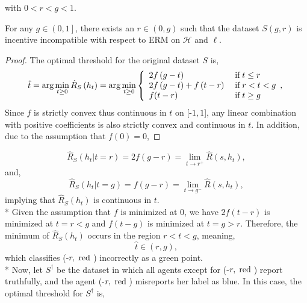 \documentclass{article}
\begin{document}
with $0 < r < g < 1$.
\newline \newline
\begin{prop} \label{prop:ex1} 
For any $g  \in \left(0, 1\right]$, there exists an $r  \in \left(0, g\right)$ such that the dataset $S\left(g, r \right) $ is incentive incompatible with respect to ERM on $\mathcal{H}$ and $\ell$.
\end{prop}
\begin{proof} \label{proof:ex1pf} 
The optimal threshold for the original dataset $S $ is,
\begin{equation} \hat{t} = \arg\displaystyle\min_{t \geq  0} \hat{R}_{S}\left(h_{t}\right) = \arg\displaystyle\min_{t \geq  0}\left\{ \begin{array}{ll}
2 f\left(g - t\right)& \text{\;if\;} t \leq  r \\
2 f\left(g - t\right) + f\left(t - r\right)& \text{\;if\;} r < t < g \\
f(t - r)& \text{\;if\;} t \geq  g \\
\end{array},\right. \end{equation}
Since $f $ is strictly convex thus continuous in $t $ on [-$1, 1$], any linear combination with positive coefficients is also strictly convex and continuous in $t $. In addition, due to the assumption that $f\left(0\right)  = 0$,
\end{proof}
\begin{equation} 
\hat{R}_{S}\left(h_{t} | t = r\right) = 2 f\left(g - r\right) = \lim_{t \to  r^{+}} \hat{R}\left(s, h_{t}\right),
\end{equation}
and,
\begin{equation} 
\hat{R}_{S}\left(h_{t} | t = g\right) = f\left(g - r\right) = \lim_{t \to  g^{-}} \hat{R}\left(s, h_{t}\right),
\end{equation}
implying that $\hat{R}_{S}\left(h_{t}\right)$ is continuous in $t. $
\\* Given the assumption that $f $ is minimized at $0$, we have $2 f\left(t - r\right) $ is minimized at $t  = r < g$ and $f\left(t - g\right) $ is minimized at $t  = g > r$. Therefore, the minimum of $\hat{R}_{S}\left(h_{t}\right)$ occurs in the region $r  < t < g $, meaning,
\begin{equation} 
\hat{t} \in \left(r , g \right),
\end{equation}
which classifies (-$r , \text{\;red\;}$) incorrectly as a green point.
\\* Now, let $S^{\dagger}$ be the dataset in which all agents except for (-$r , \text{\;red\;}$) report truthfully, and the agent (-$r , \text{\;red\;}$) misreports her label as blue. In this case, the optimal threshold for $S^{\dagger}$ is,
\end{document}
